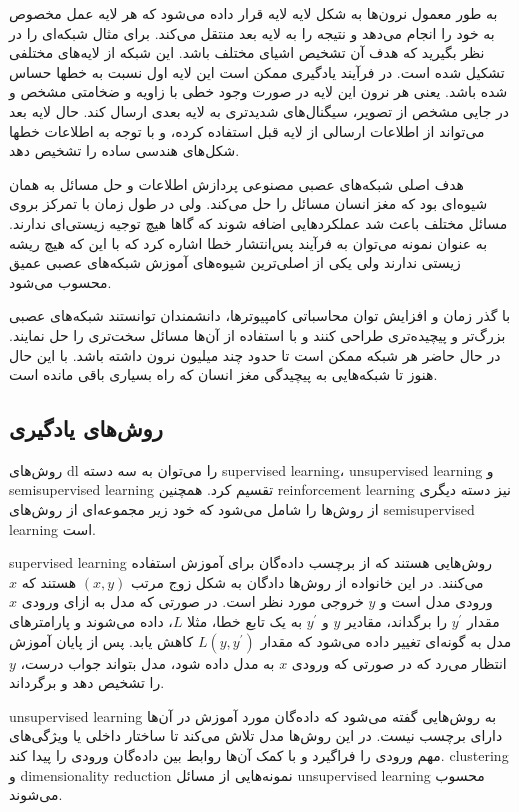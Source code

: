 به طور معمول نرون‌ها به شکل لایه لایه قرار داده می‌شود که هر لایه عمل مخصوص به
خود را انجام می‌دهد و نتیجه را به لایه بعد منتقل می‌کند. برای مثال شبکه‌ای را در
نظر بگیرید که هدف آن تشخیص اشیای مختلف باشد. این شبکه از لایه‌های مختلفی تشکیل
شده است. در فرآیند یادگیری ممکن است این لایه اول نسبت به خطها حساس شده باشد.
یعنی هر نرون این لایه در صورت وجود خطی با زاویه و ضخامتی مشخص و در جایی مشخص از
تصویر، سیگنال‌های شدیدتری به لایه بعدی ارسال کند. حال لایه بعد می‌تواند از
اطلاعات ارسالی از لایه قبل استفاده کرده، و با توجه به اطلاعات خطها شکل‌های هندسی
ساده را تشخیص دهد.

هدف اصلی شبکه‌های عصبی مصنوعی پردازش اطلاعات و حل مسائل به همان شیوه‌ای بود که
مغز انسان مسائل را حل می‌کند. ولی در طول زمان با تمرکز بروی مسائل مختلف باعث شد
عملکردهایی اضافه شوند که گاها هیچ توجیه زیستی‌ای ندارند. به عنوان نمونه می‌توان
به فرآیند پس‌انتشار خطا اشاره کرد که با این که هیچ ریشه زیستی ندارند ولی یکی از
اصلی‌ترین شیوه‌های آموزش شبکه‌های عصبی عمیق محسوب می‌شود.

با گذر زمان و افزایش توان محاسباتی کامپیوترها، دانشمندان توانستند شبکه‌های عصبی
بزرگ‌تر و پیچیده‌تری طراحی کنند و با استفاده از آن‌ها مسائل سخت‌تری را حل
نمایند. در حال حاضر هر شبکه ممکن است تا حدود چند میلیون نرون داشته باشد. با این
حال هنوز تا شبکه‌هایی به پیچیدگی مغز انسان که راه بسیاری باقی مانده است.

\subsection{روش‌های یادگیری}
روش‌های \gls{dl} را می‌توان به سه دسته \gls{supervised learning}،
\gls{unsupervised learning} و \gls{semisupervised learning} تقسیم کرد. همچنین
\gls{reinforcement learning} نیز دسته دیگری از روش‌ها را شامل می‌شود که خود زیر مجموعه‌ای از
روش‌های \gls{semisupervised learning} است.

\gls{supervised learning} روش‌هایی هستند که از برچسب داده‌گان برای آموزش استفاده
می‌کنند. در این خانواده از روش‌ها دادگان به شکل زوج مرتب $(x, y)$ هستند که $x$
ورودی مدل است و $y$ خروجی مورد نظر است. در صورتی که مدل به ازای ورودی $x$ مقدار
$y^{\prime}$ را برگداند، مقادیر $y$ و $y^\prime$ به یک تابع خطا، مثلا $L$، داده
می‌شوند و پارامترهای مدل به گونه‌ای تغییر داده می‌شود که مقدار $L(y, y^\prime)$
کاهش یابد. پس از پایان آموزش انتظار می‌رد که در صورتی که ورودی $x$ به مدل داده
شود، مدل بتواند جواب درست، $y$ را تشخیص دهد و برگرداند.

\gls{unsupervised learning} به روش‌هایی گفته می‌شود که داده‌گان مورد آموزش در
آن‌ها دارای برچسب نیست‌. در این روش‌ها مدل تلاش می‌کند تا ساختار داخلی یا
ویژگی‌های مهم ورودی را فراگیرد و با کمک آن‌ها روابط بین داده‌گان ورودی را
پیدا کند. \gls{clustering} و \gls{dimensionality reduction} نمونه‌هایی از مسائل
\gls{unsupervised learning} محسوب می‌شوند.

